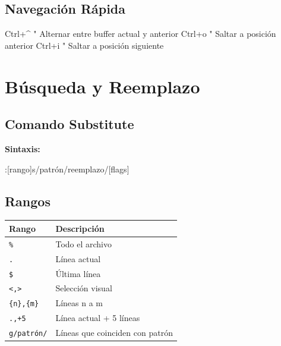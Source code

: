\documentclass[
  doc,
  floatsintext,
  longtable,
  a4paper,
  nolmodern,
  notxfonts,
  notimes,
  12pt,
  colorlinks=true,linkcolor=blue,citecolor=blue,urlcolor=blue]{apa7}
\newenvironment{Shaded}{\begin{snugshade}}{\end{snugshade}}
\newcommand{\NormalTok}[1]{\textcolor[rgb]{0.00,0.23,0.31}{#1}}
\newcounter{none} %
\begin{document}
\subsection{Navegación Rápida}\label{navegaciuxf3n-ruxe1pida}

\begin{Shaded}
\begin{Highlighting}[]
\NormalTok{Ctrl+\^{}      " Alternar entre buffer actual y anterior}
\NormalTok{Ctrl+o      " Saltar a posición anterior}
\NormalTok{Ctrl+i      " Saltar a posición siguiente}
\end{Highlighting}
\end{Shaded}

\section{Búsqueda y Reemplazo}\label{buxfasqueda-y-reemplazo}

\subsection{Comando Substitute}\label{comando-substitute}

\textbf{Sintaxis:}

\begin{Shaded}
\begin{Highlighting}[]
\NormalTok{:[rango]s/patrón/reemplazo/[flags]}
\end{Highlighting}
\end{Shaded}

\subsection{Rangos}\label{rangos}

{\def\LTcaptype{none} %
\begin{longtable}[]{@{}ll@{}}
\toprule\noalign{}
Rango & Descripción \\
\midrule\noalign{}
\endhead
\bottomrule\noalign{}
\endlastfoot
\texttt{\%} & Todo el archivo \\
\texttt{.} & Línea actual \\
\texttt{\$} & Última línea \\
\texttt{\textquotesingle{}\textless{},\textquotesingle{}\textgreater{}}
& Selección visual \\
\texttt{\{n\},\{m\}} & Líneas n a m \\
\texttt{.,+5} & Línea actual + 5 líneas \\
\texttt{g/patrón/} & Líneas que coinciden con patrón \\
\end{longtable}
}
\end{document}
